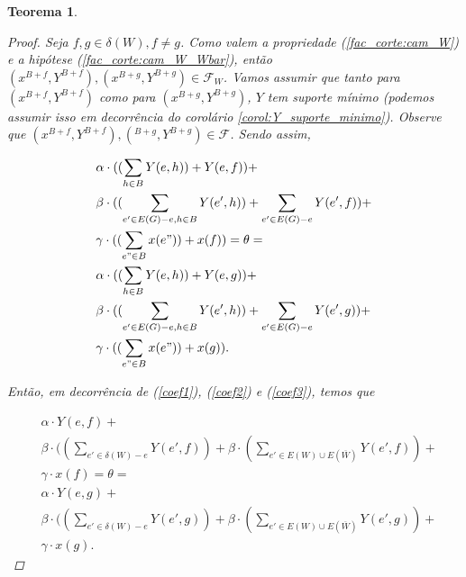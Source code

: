 \documentclass[11pt,reqno]{amsart}
\newtheorem{teorema}{Teorema}
\newcommand{\incid}{\mathcal{X}}
\newcommand{\incidY}{\mathcal{Y}}
\newcommand{\facetF}{\mathcal{F}}
\begin{document}
\begin{teorema}
\begin{proof}


Seja $f,g \in \delta(W), f \neq g$. Como valem a propriedade (\ref{fac_corte:cam_W}) 
e a hipótese (\ref{fac_corte:cam_W_Wbar}), então 
$(x^{B+f},Y^{B+f}), (x^{B+g},Y^{B+g}) \in \facetF_W$. 
Vamos assumir que tanto para $(x^{B+f},Y^{B+f})$ como para 
$(x^{B+g},Y^{B+g})$, $Y$ tem suporte mínimo (podemos assumir isso 
em decorrência do corolário \ref{corol:Y_suporte_minimo}). 
Observe que 
$(x^{B+f},Y^{B+f}), (^{B+g},Y^{B+g}) \in \facetF$. 
Sendo assim, 

\begin{equation*}
\begin{split}
&\alpha \cdot ((\sum_{h \in B} Y(e,h)) + Y(e,f)) + \\
&\beta \cdot ((\sum_{e' \in E(G) - e, h \in B} Y(e',h)) + \sum_{e' \in E(G) - e}Y(e',f)) + \\
&\gamma \cdot ((\sum_{e" \in B} x(e")) + x(f)) = \theta = \\
&\alpha \cdot ((\sum_{h \in B} Y(e,h)) + Y(e,g)) + \\
&\beta \cdot ((\sum_{e' \in E(G) - e, h \in B} Y(e',h)) + \sum_{e' \in E(G) - e}Y(e',g)) + \\
&\gamma \cdot ((\sum_{e" \in B} x(e")) + x(g)).
\end{split}
\end{equation*}

Então, em decorrência de (\ref{coef1}), (\ref{coef2}) e (\ref{coef3}), temos que 

\begin{equation*}
\begin{split}
&\alpha \cdot Y(e,f) + \\
&\beta \cdot ((\sum_{e' \in \delta(W) - e} Y(e',f)) + \beta \cdot (\sum_{e' \in E(W) \cup E(\overline{W})}Y(e',f)) + \\
&\gamma \cdot x(f) = \theta = \\
&\alpha \cdot Y(e,g) + \\
&\beta \cdot ((\sum_{e' \in \delta(W) - e} Y(e',g)) + \beta \cdot (\sum_{e' \in E(W) \cup E(\overline{W})}Y(e',g)) + \\
&\gamma \cdot x(g).
\end{split}
\end{equation*}


\end{proof}
\end{teorema}
\end{document}
